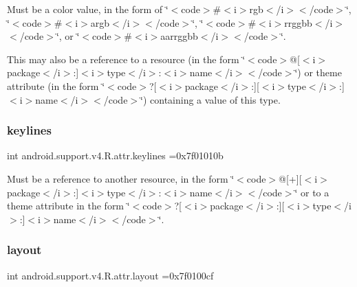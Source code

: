 Must be a color value, in the form of \char`\"{}$<$code$>$\#$<$i$>$rgb$<$/i$>$$<$/code$>$\char`\"{}, \char`\"{}$<$code$>$\#$<$i$>$argb$<$/i$>$$<$/code$>$\char`\"{}, \char`\"{}$<$code$>$\#$<$i$>$rrggbb$<$/i$>$$<$/code$>$\char`\"{}, or \char`\"{}$<$code$>$\#$<$i$>$aarrggbb$<$/i$>$$<$/code$>$\char`\"{}. 

This may also be a reference to a resource (in the form \char`\"{}$<$code$>$@\mbox{[}$<$i$>$package$<$/i$>$\+:\mbox{]}$<$i$>$type$<$/i$>$\+:$<$i$>$name$<$/i$>$$<$/code$>$\char`\"{}) or theme attribute (in the form \char`\"{}$<$code$>$?\mbox{[}$<$i$>$package$<$/i$>$\+:\mbox{]}\mbox{[}$<$i$>$type$<$/i$>$\+:\mbox{]}$<$i$>$name$<$/i$>$$<$/code$>$\char`\"{}) containing a value of this type. \mbox{\label{classandroid_1_1support_1_1v4_1_1R_1_1attr_a268b3fabe0ef0d9222f43931b0af5d39}} 
\subsubsection{\texorpdfstring{keylines}{keylines}}
{\footnotesize\ttfamily int android.\+support.\+v4.\+R.\+attr.\+keylines =0x7f01010b\hspace{0.3cm}{\ttfamily [static]}}

Must be a reference to another resource, in the form \char`\"{}$<$code$>$@\mbox{[}+\mbox{]}\mbox{[}$<$i$>$package$<$/i$>$\+:\mbox{]}$<$i$>$type$<$/i$>$\+:$<$i$>$name$<$/i$>$$<$/code$>$\char`\"{} or to a theme attribute in the form \char`\"{}$<$code$>$?\mbox{[}$<$i$>$package$<$/i$>$\+:\mbox{]}\mbox{[}$<$i$>$type$<$/i$>$\+:\mbox{]}$<$i$>$name$<$/i$>$$<$/code$>$\char`\"{}. \mbox{\label{classandroid_1_1support_1_1v4_1_1R_1_1attr_a0bf2f94b527cc15b68bf05ba0e93849d}} 
\subsubsection{\texorpdfstring{layout}{layout}}
{\footnotesize\ttfamily int android.\+support.\+v4.\+R.\+attr.\+layout =0x7f0100cf\hspace{0.3cm}{\ttfamily [static]}}

